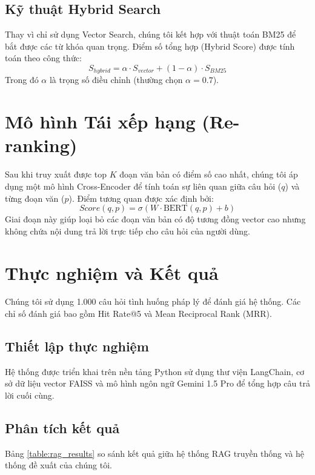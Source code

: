 \documentclass[11pt,a4paper]{article}
\begin{document}
\subsection{Kỹ thuật Hybrid Search}
Thay vì chỉ sử dụng Vector Search, chúng tôi kết hợp với thuật toán BM25 để bắt được các từ khóa quan trọng. Điểm số tổng hợp (Hybrid Score) được tính toán theo công thức:
\begin{equation}
    S_{hybrid} = \alpha \cdot S_{vector} + (1 - \alpha) \cdot S_{BM25}
\end{equation}
Trong đó $\alpha$ là trọng số điều chỉnh (thường chọn $\alpha = 0.7$).

\section{Mô hình Tái xếp hạng (Re-ranking)}
Sau khi truy xuất được top $K$ đoạn văn bản có điểm số cao nhất, chúng tôi áp dụng một mô hình Cross-Encoder để tính toán sự liên quan giữa câu hỏi ($q$) và từng đoạn văn ($p$). Điểm tương quan được xác định bởi:
\begin{equation}
    Score(q, p) = \sigma(W \cdot \text{BERT}(q, p) + b)
\end{equation}
Giai đoạn này giúp loại bỏ các đoạn văn bản có độ tương đồng vector cao nhưng không chứa nội dung trả lời trực tiếp cho câu hỏi của người dùng.

\section{Thực nghiệm và Kết quả}
Chúng tôi sử dụng 1.000 câu hỏi tình huống pháp lý để đánh giá hệ thống. Các chỉ số đánh giá bao gồm Hit Rate@5 và Mean Reciprocal Rank (MRR).

\subsection{Thiết lập thực nghiệm}
Hệ thống được triển khai trên nền tảng Python sử dụng thư viện LangChain, cơ sở dữ liệu vector FAISS và mô hình ngôn ngữ Gemini 1.5 Pro để tổng hợp câu trả lời cuối cùng.

\subsection{Phân tích kết quả}
Bảng \ref{table:rag_results} so sánh kết quả giữa hệ thống RAG truyền thống và hệ thống đề xuất của chúng tôi.
\end{document}
